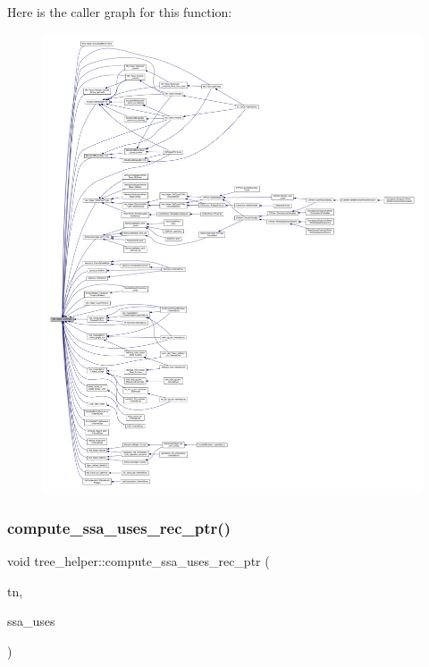 Here is the caller graph for this function\+:
\nopagebreak
\begin{figure}[H]
\begin{center}
\leavevmode
\includegraphics[width=350pt]{d7/d99/classtree__helper_ab889be102080bfbbbb7cf7b69c3e932d_icgraph}
\end{center}
\end{figure}
\mbox{\label{classtree__helper_aaa8a871e73116f94f3bb09dd4af063ef}} 
\subsubsection{\texorpdfstring{compute\+\_\+ssa\+\_\+uses\+\_\+rec\+\_\+ptr()}{compute\_ssa\_uses\_rec\_ptr()}}
{\footnotesize\ttfamily void tree\+\_\+helper\+::compute\+\_\+ssa\+\_\+uses\+\_\+rec\+\_\+ptr (\begin{DoxyParamCaption}\item[{const \hyperlink{tree__node_8hpp_a6ee377554d1c4871ad66a337eaa67fd5}{tree\+\_\+node\+Ref} \&}]{tn,  }\item[{\hyperlink{classCustomOrderedSet}{Custom\+Ordered\+Set}$<$ \hyperlink{structssa__name}{ssa\+\_\+name} $\ast$$>$ \&}]{ssa\+\_\+uses }\end{DoxyParamCaption})\hspace{0.3cm}{\ttfamily [static]}}



